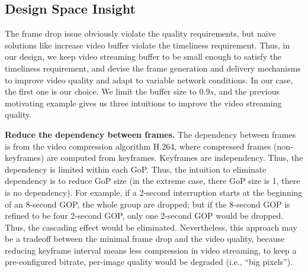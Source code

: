 \subsection{Design Space Insight}
The frame drop issue obviously violate the quality requirements, but naive solutions like increase video buffer violate the timeliness requirement. Thus, in our design, we keep video streaming buffer to be small enough to satisfy the timeliness requirement, and devise the frame generation and delivery mechanisms to improve video quality and adapt to variable network conditions. In our case, the first one is our choice. We limit the buffer size to $0.9s$, and the previous motivating example gives us three intuitions to improve the video streaming quality.


\textbf{Reduce the dependency between frames.}
The dependency between frames is from the video compression algorithm H.264, where compressed frames (non-keyframes) are computed from keyframes. Keyframes are independency. Thus, the dependency is limited within each GoP. Thus, the intuition to eliminate dependency is to reduce GoP size (in the extreme case, there GoP size is 1, there is no dependency). For example, if a 2-second interruption starts at the beginning of an 8-second GOP, the whole group are dropped; but if the 8-second GOP is refined to be four 2-second GOP, only one 2-second GOP would be dropped. Thus, the cascading effect would be eliminated. Nevertheless, this approach may be a tradeoff between the minimal frame drop and the video quality, because reducing keyframe interval means less compression in video streaming, to keep a pre-configured bitrate, per-image quality would be degraded (i.e., ``big pixels'').



